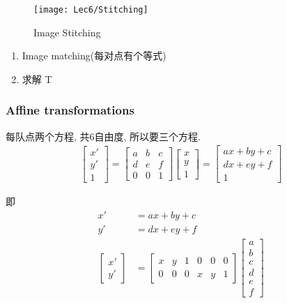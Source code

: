 \begin{figure}[H]
    \centering
    \texttt{[image: Lec6/Stitching]}
    \caption{Image Stitching}
\end{figure}

\begin{enumerate}
    \item Image matching(每对点有个等式)
    \item 求解 T
\end{enumerate}

\subsubsection{Affine transformations}
每队点两个方程, 共6自由度, 所以要三个方程. 
\begin{align*}
    \begin{bmatrix}
        x'\\y'\\1
    \end{bmatrix}=\begin{bmatrix}
        a&b&c\\d&e&f\\0&0&1
    \end{bmatrix}\begin{bmatrix}
        x\\y\\1
    \end{bmatrix}=\begin{bmatrix}
        ax+by+c\\dx+ey+f\\1
    \end{bmatrix}
\end{align*}

即
\begin{align*}
    x'&=ax+by+c\\
    y'&=dx+ey+f\\
    \begin{bmatrix}
        x'\\y'
    \end{bmatrix}&=\begin{bmatrix}
        x&y&1&0&0&0\\0&0&0&x&y&1
    \end{bmatrix}\begin{bmatrix}
        a\\b\\c\\d\\e\\f
    \end{bmatrix}
\end{align*}


